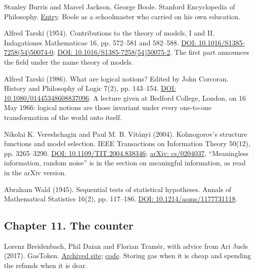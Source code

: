 \noindent Stanley Burris and Marcel Jackson. George Boole. Stanford Encyclopedia of Philosophy. \href{https://plato.stanford.edu/entries/boole/}{Entry}. Boole as a schoolmaster who carried on his own education.
\par\medskip

\noindent Alfred Tarski (1954). Contributions to the theory of models, I and II. Indagationes Mathematicae 16, pp. 572--581 and 582--588. \href{https://doi.org/10.1016/S1385-7258(54)50074-0}{DOI: 10.1016/S1385-7258(54)50074-0}; \href{https://doi.org/10.1016/S1385-7258(54)50075-2}{DOI: 10.1016/S1385-7258(54)50075-2}. The first part announces the field under the name theory of models.
\par\medskip

\noindent Alfred Tarski (1986). What are logical notions? Edited by John Corcoran. History and Philosophy of Logic 7(2), pp. 143--154. \href{https://doi.org/10.1080/01445348608837096}{DOI: 10.1080/01445348608837096}. A lecture given at Bedford College, London, on 16 May 1966: logical notions are those invariant under every one-to-one transformation of the world onto itself.
\par\medskip

\noindent Nikolai K. Vereshchagin and Paul M. B. Vit\'anyi (2004). Kolmogorov's structure functions and model selection. IEEE Transactions on Information Theory 50(12), pp. 3265--3290. \href{https://doi.org/10.1109/TIT.2004.838346}{DOI: 10.1109/TIT.2004.838346}; \href{https://arxiv.org/abs/cs/0204037}{arXiv: cs/0204037}. ``Meaningless information, random noise'' is in the section on meaningful information, as read in the arXiv version.
\par\medskip

\noindent Abraham Wald (1945). Sequential tests of statistical hypotheses. Annals of Mathematical Statistics 16(2), pp. 117--186. \href{https://doi.org/10.1214/aoms/1177731118}{DOI: 10.1214/aoms/1177731118}.
\par\medskip

\subsection*{Chapter 11. The counter}

\noindent Lorenz Breidenbach, Phil Daian and Florian Tram\`er, with advice from Ari Juels (2017). GasToken. \href{http://web.archive.org/web/20180308200043/https://gastoken.io/}{Archived site}; \href{https://github.com/projectchicago/gastoken}{code}. Storing gas when it is cheap and spending the refunds when it is dear.
\par\medskip

